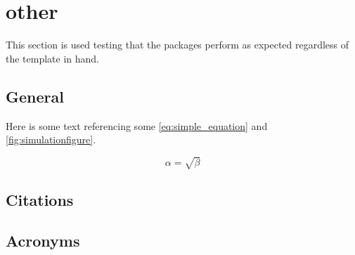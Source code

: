 \graphicspath{ {./content/other/figures/} }

\section{other}
\label{sec:other}  %

This section is used testing that the packages perform as expected regardless of the template in hand.

\subsection{General}
\label{sec:other:general}
Here is some text referencing some \cref{eq:simple_equation} and \cref{fig:simulationfigure}.

\begin{equation}
    \label{eq:simple_equation}
    \alpha = \sqrt{ \beta }
\end{equation}


\subsection{Citations}
\label{sec:other:citations}


\subsection{Acronyms}
\label{sec:other:acro}




